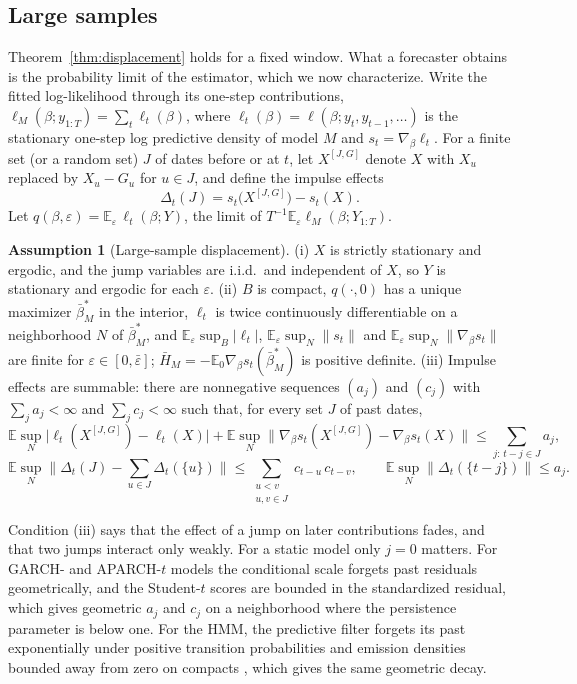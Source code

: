 \documentclass[11pt,a4paper]{article}
\theoremstyle{definition}
\newtheorem{assumption}{Assumption}
\theoremstyle{remark}
\newcommand{\E}{\mathbb{E}}
\begin{document}
\subsection{Large samples}\label{sec:largeT}
Theorem~\ref{thm:displacement} holds for a fixed window. What a forecaster obtains is the probability limit of the estimator, which we now characterize. Write the fitted log-likelihood through its one-step contributions, $\ell_M(\beta;y_{1:T})=\sum_t\ell_t(\beta)$, where $\ell_t(\beta)=\ell(\beta;y_t,y_{t-1},\dots)$ is the stationary one-step log predictive density of model $M$ and $s_t=\nabla_\beta\ell_t$. For a finite set (or a random set) $J$ of dates before or at $t$, let $X^{[J,G]}$ denote $X$ with $X_u$ replaced by $X_u-G_u$ for $u\in J$, and define the impulse effects
\[
\Delta_t(J)=s_t\big(X^{[J,G]}\big)-s_t(X).
\]
Let $q(\beta,\varepsilon)=\E_\varepsilon\,\ell_t(\beta;Y)$, the limit of $T^{-1}\E_\varepsilon\ell_M(\beta;Y_{1:T})$.

\begin{assumption}[Large-sample displacement]\label{A:largeT}
(i) $X$ is strictly stationary and ergodic, and the jump variables are i.i.d.\ and independent of $X$, so $Y$ is stationary and ergodic for each $\varepsilon$. (ii) $B$ is compact, $q(\cdot,0)$ has a unique maximizer $\bar\beta^*_M$ in the interior, $\ell_t$ is twice continuously differentiable on a neighborhood $N$ of $\bar\beta^*_M$, and $\E_\varepsilon\sup_B|\ell_t|$, $\E_\varepsilon\sup_N\|s_t\|$ and $\E_\varepsilon\sup_N\|\nabla_\beta s_t\|$ are finite for $\varepsilon\in[0,\bar\varepsilon]$; $\bar H_M=-\E_0\nabla_\beta s_t(\bar\beta^*_M)$ is positive definite. (iii) Impulse effects are summable: there are nonnegative sequences $(a_j)$ and $(c_j)$ with $\sum_ja_j<\infty$ and $\sum_jc_j<\infty$ such that, for every set $J$ of past dates,
\[
\E\sup_N\big|\ell_t(X^{[J,G]})-\ell_t(X)\big|+\E\sup_N\big\|\nabla_\beta s_t(X^{[J,G]})-\nabla_\beta s_t(X)\big\|\le\sum_{j:\,t-j\in J}a_j,
\]
\[
\E\sup_N\Big\|\Delta_t(J)-\sum_{u\in J}\Delta_t(\{u\})\Big\|\le\sum_{\substack{u<v\\u,v\in J}}c_{t-u}\,c_{t-v},\qquad \E\sup_N\|\Delta_t(\{t-j\})\|\le a_j .
\]
\end{assumption}
\noindent Condition (iii) says that the effect of a jump on later contributions fades, and that two jumps interact only weakly. For a static model only $j=0$ matters. For GARCH- and APARCH-$t$ models the conditional scale forgets past residuals geometrically, and the Student-$t$ scores are bounded in the standardized residual, which gives geometric $a_j$ and $c_j$ on a neighborhood where the persistence parameter is below one. For the HMM, the predictive filter forgets its past exponentially under positive transition probabilities and emission densities bounded away from zero on compacts \citep{legland2000,douc2004}, which gives the same geometric decay.
\end{document}
